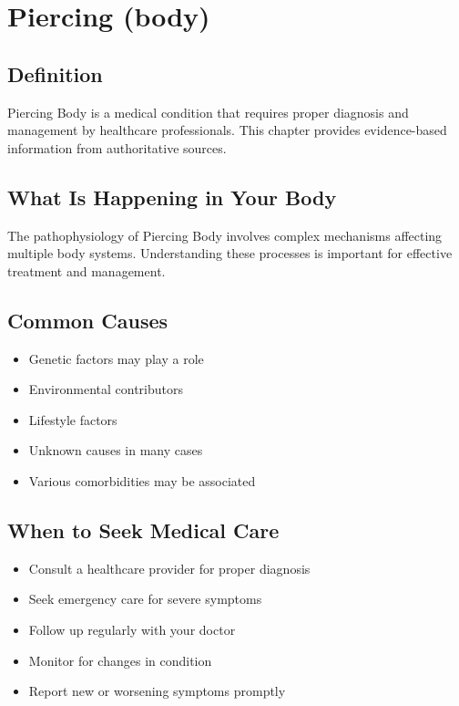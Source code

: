 
\chapter{Piercing (body)}

\section*{Definition}
Piercing Body is a medical condition that requires proper diagnosis and management by healthcare professionals. This chapter provides evidence-based information from authoritative sources.

\section*{What Is Happening in Your Body}
The pathophysiology of Piercing Body involves complex mechanisms affecting multiple body systems. Understanding these processes is important for effective treatment and management.

\section*{Common Causes}
\begin{itemize}
  \item Genetic factors may play a role
  \item Environmental contributors
  \item Lifestyle factors
  \item Unknown causes in many cases
  \item Various comorbidities may be associated
\end{itemize}

\section*{When to Seek Medical Care}
\begin{itemize}
  \item Consult a healthcare provider for proper diagnosis
  \item Seek emergency care for severe symptoms
  \item Follow up regularly with your doctor
  \item Monitor for changes in condition
  \item Report new or worsening symptoms promptly
\end{itemize}


